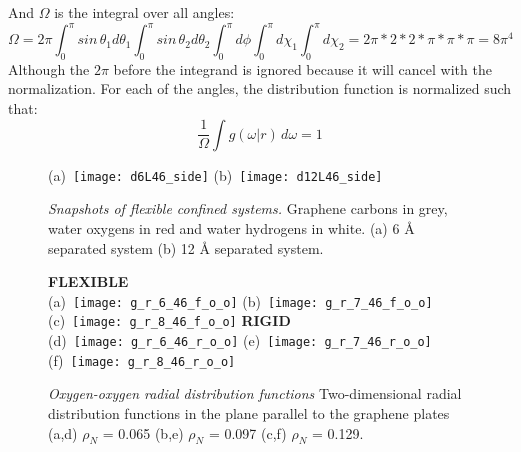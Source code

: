 \documentclass[12pt]{article}
\begin{document}
And \(\Omega\) is the integral over all angles:
\begin{equation}
    \Omega = 2\pi \int_0^\pi sin \, \theta_1 d \theta_1 \int_0^\pi sin \, \theta_2 d \theta_2 \int_0^\pi d\phi\int_0^\pi d\chi_1 \int_0^\pi d\chi_2 = 2 \pi * 2 * 2 * \pi * \pi * \pi = 8 \pi^4
\end{equation}
Although the \(2\pi\) before the integrand is ignored because it will cancel with the normalization. For each of the angles, the distribution function is normalized such that:
\begin{equation}
    \frac{1}{\Omega} \int g(\omega | r ) \, d \omega = 1  
\end{equation}

\begin{figure}[h!]
	\centering
	(a)~\texttt{[image: d6L46\_side]} 
	(b)~\texttt{[image: d12L46\_side]}
	\vspace{-10pt}
	\caption{\textit{Snapshots of flexible confined systems.} Graphene carbons in grey, water oxygens in red and water hydrogens in white. (a) 6 \r A separated system (b) 12 \r A separated system. }
	\label{fig:snapshot}
\end{figure}

\begin{figure}[h!]
	\centering
	\textbf{FLEXIBLE} \\
	(a)~\texttt{[image: g\_r\_6\_46\_f\_o\_o]} 
	(b)~\texttt{[image: g\_r\_7\_46\_f\_o\_o]}
	(c)~\texttt{[image: g\_r\_8\_46\_f\_o\_o]}
	\textbf{RIGID} \\
	(d)~\texttt{[image: g\_r\_6\_46\_r\_o\_o]} 
	(e)~\texttt{[image: g\_r\_7\_46\_r\_o\_o]}
	 (f)~\texttt{[image: g\_r\_8\_46\_r\_o\_o]}
	\vspace{-10pt}
	\caption{\textit{Oxygen-oxygen radial distribution functions} Two-dimensional radial distribution functions in the plane parallel to the graphene plates (a,d) \(\rho_N\) = 0.065 (b,e) \(\rho_N\) = 0.097 (c,f) \(\rho_N\) = 0.129.}
	\label{fig:gr}
\end{figure}
\end{document}
